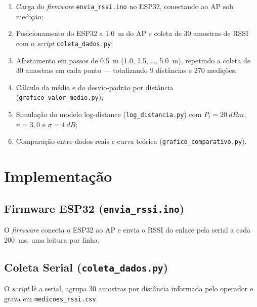 \documentclass[
  12pt,
  a4paper,
  oneside,
  brazil,
  chapter=TITLE,
  section=TITLE,
]{abntex2}
\begin{document}
\begin{enumerate}
  \item Carga do \textit{firmware} \texttt{envia\_rssi.ino} no ESP32, conectando
        ao AP sob medi\c{c}\~ao;
  \item Posicionamento do ESP32 a \SI{1.0}{\meter} do AP e coleta de 30 amostras
        de RSSI com o \textit{script} \texttt{coleta\_dados.py};
  \item Afastamento em passos de \SI{0.5}{\meter} (\num{1.0}, \num{1.5},
        \ldots, \SI{5.0}{\meter}), repetindo a coleta de 30 amostras em cada
        ponto --- totalizando 9 dist\^ancias e 270 medi\c{c}\~oes;
  \item C\'alculo da m\'edia e do desvio-padr\~ao por dist\^ancia
        (\texttt{grafico\_valor\_medio.py});
  \item Simula\c{c}\~ao do modelo log-distance (\texttt{log\_distancia.py}) com
        $P_t = \SI{20}{dBm}$, $n = 3{,}0$ e $\sigma = \SI{4}{dB}$;
  \item Compara\c{c}\~ao entre dados reais e curva te\'orica
        (\texttt{grafico\_comparativo.py}).
\end{enumerate}

\chapter{Implementa\c{c}\~ao}

\section{Firmware ESP32 (\texttt{envia\_rssi.ino})}

O \textit{firmware} conecta o ESP32 ao AP e envia o RSSI do enlace pela serial a
cada \SI{200}{\milli\second}, uma leitura por linha.



\section{Coleta Serial (\texttt{coleta\_dados.py})}

O \textit{script} l\^e a serial, agrupa 30 amostras por dist\^ancia informada
pelo operador e grava em \texttt{medicoes\_rssi.csv}.


\end{document}
